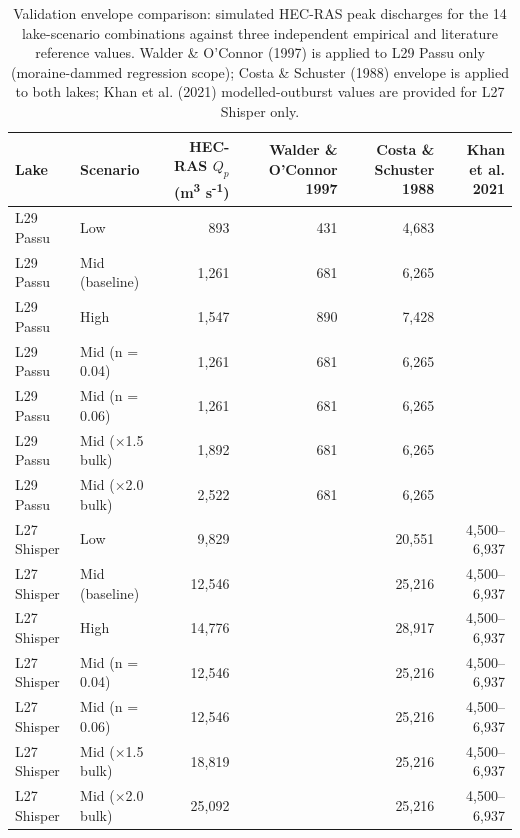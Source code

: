 \begin{table}[ht]
\centering
\scriptsize
\caption{Validation envelope comparison: simulated HEC-RAS peak discharges for the 14 lake-scenario combinations against three independent empirical and literature reference values. Walder \& O'Connor (1997) is applied to L29 Passu only (moraine-dammed regression scope); Costa \& Schuster (1988) envelope is applied to both lakes; Khan et al. (2021) modelled-outburst values are provided for L27 Shisper only.}
\label{tab:validation}
\begin{tabular}{llrrrr}
\hline
Lake & Scenario & HEC-RAS $Q_p$ (m\textsuperscript{3} s\textsuperscript{-1}) & Walder \& O'Connor 1997 & Costa \& Schuster 1988 & Khan et al. 2021 \\
\hline
L29 Passu & Low & 893 & 431 & 4,683 & \textemdash{} \\
L29 Passu & Mid (baseline) & 1,261 & 681 & 6,265 & \textemdash{} \\
L29 Passu & High & 1,547 & 890 & 7,428 & \textemdash{} \\
L29 Passu & Mid (n = 0.04) & 1,261 & 681 & 6,265 & \textemdash{} \\
L29 Passu & Mid (n = 0.06) & 1,261 & 681 & 6,265 & \textemdash{} \\
L29 Passu & Mid (×1.5 bulk) & 1,892 & 681 & 6,265 & \textemdash{} \\
L29 Passu & Mid (×2.0 bulk) & 2,522 & 681 & 6,265 & \textemdash{} \\
L27 Shisper & Low & 9,829 & \textemdash{} & 20,551 & 4,500–6,937 \\
L27 Shisper & Mid (baseline) & 12,546 & \textemdash{} & 25,216 & 4,500–6,937 \\
L27 Shisper & High & 14,776 & \textemdash{} & 28,917 & 4,500–6,937 \\
L27 Shisper & Mid (n = 0.04) & 12,546 & \textemdash{} & 25,216 & 4,500–6,937 \\
L27 Shisper & Mid (n = 0.06) & 12,546 & \textemdash{} & 25,216 & 4,500–6,937 \\
L27 Shisper & Mid (×1.5 bulk) & 18,819 & \textemdash{} & 25,216 & 4,500–6,937 \\
L27 Shisper & Mid (×2.0 bulk) & 25,092 & \textemdash{} & 25,216 & 4,500–6,937 \\
\hline
\end{tabular}
\end{table}
